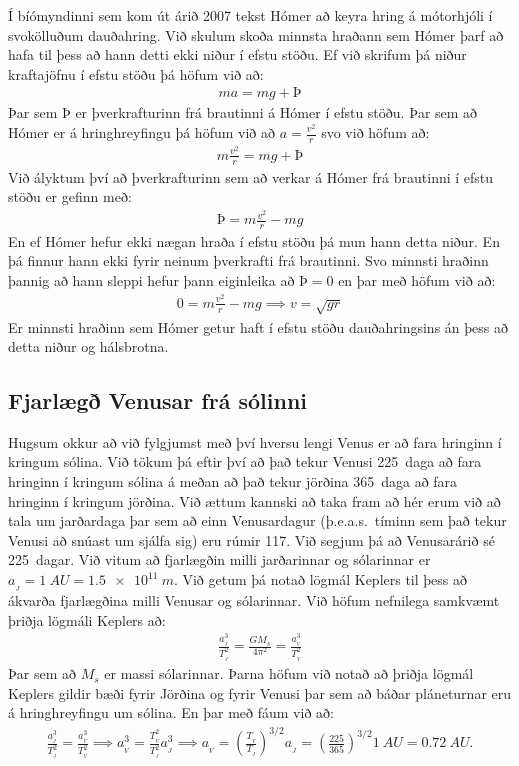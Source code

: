 \ifdefined \wholebook \else\documentclass[oneside]{book}\usepackage{EdlBook}\graphicspath{{figures/}}
\begin{document}
Í bíómyndinni  sem kom út árið 2007 tekst Hómer að keyra hring á mótorhjóli í svokölluðum dauðahring. Við skulum skoða minnsta hraðann sem Hómer þarf að hafa til þess að hann detti ekki niður í efstu stöðu. Ef við skrifum þá niður kraftajöfnu í efstu stöðu þá höfum við að:
\begin{align*}
    ma = mg + \text{Þ}
\end{align*}
Þar sem $\text{Þ}$ er þverkrafturinn frá brautinni á Hómer í efstu stöðu. Þar sem að Hómer er á hringhreyfingu þá höfum við að $a = \frac{v^2}{r}$ svo við höfum að:
\begin{align*}
    m \frac{v^2}{r} = mg + \text{Þ}
\end{align*}
Við ályktum því að þverkrafturinn sem að verkar á Hómer frá brautinni í efstu stöðu er gefinn með:
\begin{align*}
    \text{Þ} = m \frac{v^2}{r} - mg
\end{align*}
En ef Hómer hefur ekki nægan hraða í efstu stöðu þá mun hann detta niður. En þá finnur hann ekki fyrir neinum þverkrafti frá brautinni. Svo minnsti hraðinn þannig að hann sleppi hefur þann eiginleika að $\text{Þ} = 0$ en þar með höfum við að:
\begin{align*}
    0 = m \frac{v^2}{r} - mg \implies v = \sqrt{gr}
\end{align*}
Er minnsti hraðinn sem Hómer getur haft í efstu stöðu dauðahringsins án þess að detta niður og hálsbrotna.

\subsection*{Fjarlægð Venusar frá sólinni}

Hugsum okkur að við fylgjumst með því hversu lengi Venus er að fara hringinn í kringum sólina. Við tökum þá eftir því að það tekur Venusi \SI{225}{daga} að fara hringinn í kringum sólina á meðan að það tekur jörðina \SI{365}{daga} að fara hringinn í kringum jörðina. Við ættum kannski að taka fram að hér erum við að tala um jarðardaga þar sem að einn Venusardagur (þ.e.a.s.~tíminn sem það tekur Venusi að snúast um sjálfa sig) eru rúmir \SI{117}{}. Við segjum þá að Venusarárið sé \SI{225}{dagar}. Við vitum að fjarlægðin milli jarðarinnar og sólarinnar er $a_{_J} = \SI{1}{AU} = \SI{1.5e11}{m}$. Við getum þá notað lögmál Keplers til þess að ákvarða fjarlægðina milli Venusar og sólarinnar. Við höfum nefnilega samkvæmt þriðja lögmáli Keplers að:
\begin{align*}
    \frac{a_{_J}^3}{T_{_J}^2} = \frac{GM_s}{4\pi^2} = \frac{a_{_V}^3}{T_{_{V}}^2}
\end{align*}
Þar sem að $M_s$ er massi sólarinnar. Þarna höfum við notað að þriðja lögmál Keplers gildir bæði fyrir Jörðina og fyrir Venusi þar sem að báðar pláneturnar eru á hringhreyfingu um sólina. En þar með fáum við að:
\begin{align*}
   \frac{a_{_J}^3}{T_{_J}^2} =  \frac{a_{_V}^3}{T_{_V}^2} \implies a_{_V}^3 = \frac{T_{_V}^2}{T_{_J}^2} a_{_{J}}^3 \implies a_{_V} = \left(\frac{T_{_V}}{T_{_J}}\right)^{3/2} a_{_J} = \left( \frac{225}{365} \right)^{3/2} \SI{1}{AU} = \SI{0.72}{AU}.
\end{align*}
\end{document}
